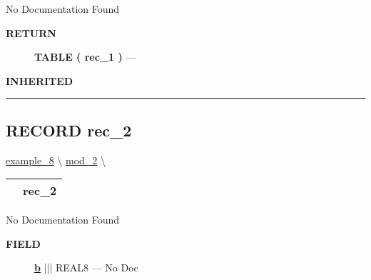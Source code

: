 No Documentation Found








\par
\begin{description}
\item [\colorbox{tagtype}{\color{white} \textbf{\textsf{RETURN}}}] \textbf{TABLE ( rec\_1 )} --- 
\end{description}






\par
\begin{description}
\item [\colorbox{tagtype}{\color{white} \textbf{\textsf{INHERITED}}}] 
\end{description}



\rule{\linewidth}{0.5pt}
\subsection*{\textsf{\colorbox{headtoc}{\color{white} RECORD}
rec\_2}}

\hypertarget{ecldoc:intest.inintest.example_8.mod_2.rec_2}{}
\hspace{0pt} \hyperlink{ecldoc:intest.inintest.example_8}{example_8} \textbackslash 
\hspace{0pt} \hyperlink{ecldoc:intest.inintest.example_8.mod_2}{mod_2} \textbackslash 

{\renewcommand{\arraystretch}{1.5}
\begin{tabularx}{\textwidth}{|>{\raggedright\arraybackslash}l|X|}
\hline
\hspace{0pt}\mytexttt{\color{red} } & \textbf{rec\_2} \\
\hline
\end{tabularx}
}

\par





No Documentation Found







\par
\begin{description}
\item [\colorbox{tagtype}{\color{white} \textbf{\textsf{FIELD}}}] \textbf{\underline{b}} ||| REAL8 --- No Doc
\end{description}





